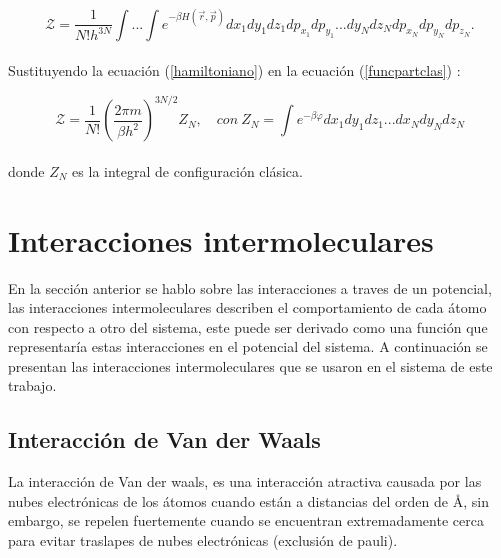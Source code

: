 \begin{equation} \label{funcpartclas}
    \mathcal{Z} = \frac{1}{N!h^{3N}}\int ...\int e^{-\beta H(\vec{r},\vec{p})}dx_1dy_1dz_1dp_{x_1}dp_{y_1}...dy_N dz_Ndp_{x_N}dp_{y_N}dp_{z_N}.
\end{equation}\\

Sustituyendo la ecuación (\ref{hamiltoniano}) en la ecuación (\ref{funcpartclas}) \cite{feynman1972statistical}:

\begin{equation} \label{funcpartclasconfig}
    \mathcal{Z} = \frac{1}{N!}\left( \frac{2\pi m}{\beta h^2} \right)^{3N/2}Z_N,\quad con\ Z_N = \int e^{-\beta\varphi}dx_1dy_1dz_1...dx_N dy_N dz_N
\end{equation}\\

donde $Z_N$ es la integral de configuración clásica.



\section{Interacciones intermoleculares}

En la sección anterior se hablo sobre las interacciones a traves de un potencial, las interacciones intermoleculares describen el comportamiento de cada átomo con respecto a otro del sistema, este puede ser derivado como una función que representaría estas interacciones en el potencial del sistema. A continuación se presentan las interacciones intermoleculares que se usaron en el sistema de este trabajo.\\

\subsection{Interacción de Van der Waals}

La interacción de Van der waals, es una interacción atractiva causada por las nubes electrónicas de los átomos cuando están a distancias del orden de \AA, sin embargo, se repelen fuertemente cuando se encuentran extremadamente cerca para evitar traslapes de nubes electrónicas (exclusión de pauli).\\

